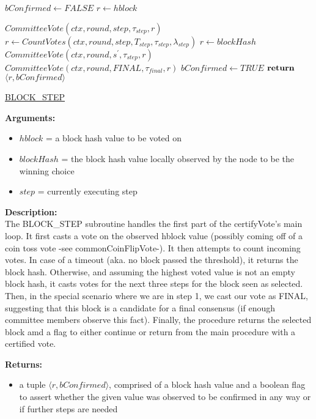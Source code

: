 \documentclass[10pt,a4paper]{article}
\begin{document}
\begin{algorithm}[H]
    \begin{algorithmic}[H]
        \State $bConfirmed \gets FALSE$
        \State $r \gets hblock$

        \State $CommitteeVote(ctx, round, step, \tau_{step}, r)$
        \State $r \gets CountVotes(ctx,round,step,T_{step},\tau_{step},\lambda_{step})$
            \State $r \gets blockHash$
                \State $CommitteeVote(ctx, round, s^\prime, \tau_{step}, r)$
            \EndFor
                \State $CommitteeVote(ctx, round, FINAL, \tau_{final}, r)$
            \EndIf
            \State $bConfirmed \gets TRUE$
        \EndIf
        $\Return$ $ \langle r, bConfirmed \rangle$
    \EndFunction
    \end{algorithmic}
    \caption{\underline{BLOCK\_STEP}}
\end{algorithm}

\noindent \textbf{Arguments:}
\begin{itemize}
    \item $hblock$ = a block hash value to be voted on
    \item $blockHash$ = the block hash value locally observed by the node to be the winning choice
    \item $step$ = currently executing step
  \end{itemize}

\noindent \textbf{Description:}\\
The BLOCK\_STEP subroutine handles the first part of the certifyVote's main loop.
It first casts a vote on the observed hblock value (possibly coming off of a coin toss vote -see commonCoinFlipVote-).
It then attempts to count incoming votes. In case of a timeout (aka. no block passed the threshold), it returns the block hash.
Otherwise, and assuming the highest voted value is not an empty block hash, it casts votes for the next three steps for the block seen as selected.
Then, in the special scenario where we are in step 1, we cast our vote as FINAL, suggesting that this block is a candidate for a final consensus (if enough committee members observe this fact).
Finally, the procedure returns the selected block amd a flag to either continue or return from the main procedure with a certified vote.

\noindent \textbf{Returns:}
\begin{itemize}
    \item a tuple $\langle r, bConfirmed \rangle$, comprised of a block hash value and a boolean flag to assert whether the given value was
    observed to be confirmed in any way or if further steps are needed
  \end{itemize}
\end{document}
